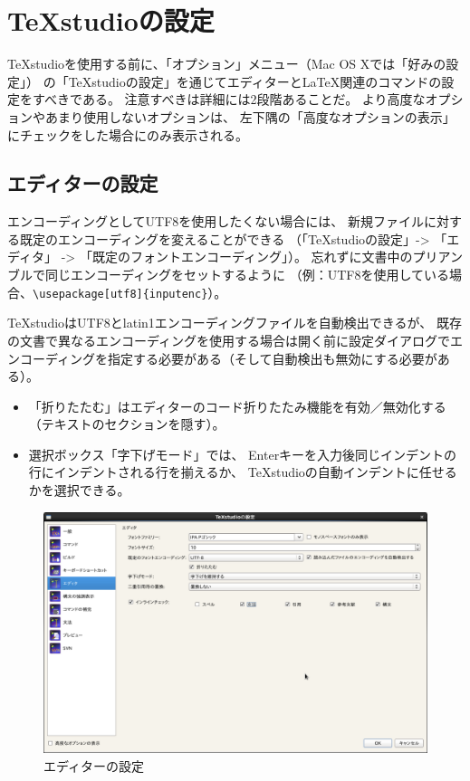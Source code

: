 \chapter{TeXstudioの設定}

TeXstudioを使用する前に、「オプション」メニュー（Mac OS Xでは「好みの設定」）
の「TeXstudioの設定」を通じてエディターとLaTeX関連のコマンドの設定をすべきである。
注意すべきは詳細には2段階あることだ。
より高度なオプションやあまり使用しないオプションは、
左下隅の「高度なオプションの表示」にチェックをした場合にのみ表示される。

\section{エディターの設定}

エンコーディングとしてUTF8を使用したくない場合には、
新規ファイルに対する既定のエンコーディングを変えることができる
（「TeXstudioの設定」-\textgreater{} 「エディタ」 -\textgreater{} 「既定のフォントエンコーディング」）。
忘れずに文書中のプリアンブルで同じエンコーディングをセットするように
（例：UTF8を使用している場合、\verb+\usepackage[utf8]{inputenc}+）。

TeXstudioはUTF8とlatin1エンコーディングファイルを自動検出できるが、
既存の文書で異なるエンコーディングを使用する場合は開く前に設定ダイアログでエンコーディングを指定する必要がある（そして自動検出も無効にする必要がある）。

\begin{itemize}
\item
  「折りたたむ」はエディターのコード折りたたみ機能を有効／無効化する（テキストのセクションを隠す）。
\item
  選択ボックス「字下げモード」では、
  Enterキーを入力後同じインデントの行にインデントされる行を揃えるか、
  TeXstudioの自動インデントに任せるかを選択できる。
\end{itemize}

\begin{figure}[H]
  \centering
  \includegraphics[width=.8\linewidth]{configure_editor.png}
  \caption{エディターの設定}
\end{figure}

